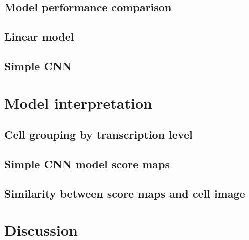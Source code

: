 \documentclass[biblatexBackend=bibtex]{tumthesis}
\begin{document}
\subsection{Model performance comparison}
\label{sec:results:comparative}


\subsection{Linear model}
\label{sec:results:lm}


\subsection{Simple CNN}
\label{sec:results:simple_cnn}


\section{Model interpretation}
\label{sec:results:model_interpretation}


\subsection{Cell grouping by transcription level}
\label{sec:results:tr_cell_div}


\subsection{Simple CNN model score maps}
\label{sec:results:simple_cnn_sm}


\subsection{Similarity between score maps and cell image}
\label{sec:results:sim_sc_ci}


\section{Discussion}


\newpage
\end{document}
